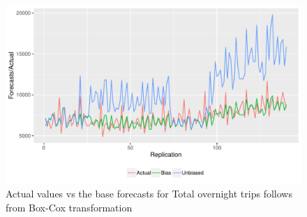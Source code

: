 \documentclass[12pt]{article}
\theoremstyle{definition}
\theoremstyle{property}
\begin{document}
\begin{figure}
	\centering
	\small
	\includegraphics[width = \textwidth]{Empirical-results/Final-results/Total_FcVsTrue_BoxCox.pdf}
	\caption{Actual values vs the base forecasts for Total overnight trips follows from Box-Cox transformation}\label{fig:Total_FcVsTrue_BoxCox}
\end{figure}





	
\end{document}
